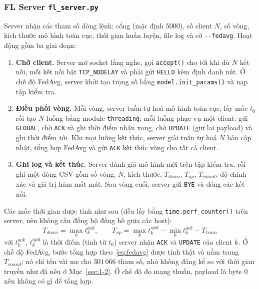 \subsubsection{FL Server \texttt{fl\_server.py}}
Server nhận các tham số dòng lệnh: cổng (mặc định 5000), số client $N$, số vòng, kích thước mô hình toàn cục, thời gian huấn luyện, file log và cờ \texttt{-{}-fedavg}. Hoạt động gồm ba giai đoạn:
\begin{enumerate}
    \item \textbf{Chờ client.} Server mở socket lắng nghe, gọi \texttt{accept()} cho tới khi đủ $N$ kết nối, mỗi kết nối bật \texttt{TCP\_NODELAY} và phải gửi \texttt{HELLO} kèm định danh nút. Ở chế độ FedAvg, server khởi tạo trọng số bằng \texttt{model.init\_params()} và nạp tập kiểm tra.
    \item \textbf{Điều phối vòng.} Mỗi vòng, server tuần tự hoá mô hình toàn cục, lấy mốc $t_0$ rồi tạo $N$ luồng bằng module \texttt{threading}; mỗi luồng phục vụ một client: gửi \texttt{GLOBAL}, chờ \texttt{ACK} và ghi thời điểm nhận xong, chờ \texttt{UPDATE} (giữ lại payload) và ghi thời điểm tới. Khi mọi luồng kết thúc, server giải tuần tự hoá $N$ bản cập nhật, tổng hợp FedAvg và gửi \texttt{ACK} kết thúc vòng cho tất cả client.
    \item \textbf{Ghi log và kết thúc.} Server đánh giá mô hình mới trên tập kiểm tra, rồi ghi một dòng CSV gồm số vòng, $N$, kích thước, $T_{down}$, $T_{up}$, $T_{round}$, độ chính xác và giá trị hàm mất mát. Sau vòng cuối, server gửi \texttt{BYE} và đóng các kết nối.
\end{enumerate}
Các mốc thời gian được tính như sau (đều lấy bằng \texttt{time.perf\_counter()} trên server, nên không cần đồng bộ đồng hồ giữa các host):
\begin{equation}
    T_{down} = \max_k t^{ack}_k, \qquad
    T_{up} = \max_k t^{upd}_k - \min_k t^{ack}_k - T_{train}
    \label{eq:measure}
\end{equation}
với $t^{ack}_k$, $t^{upd}_k$ là thời điểm (tính từ $t_0$) server nhận \texttt{ACK} và \texttt{UPDATE} của client $k$. Ở chế độ FedAvg, bước tổng hợp theo~\eqref{eq:fedavg} được tính thật và nằm trong $T_{round}$; nó chỉ tốn vài ms cho 301\,066 tham số, nhỏ không đáng kể so với thời gian truyền như đã nêu ở Mục~\ref{sec:1-2}. Ở chế độ đo mạng thuần, payload là byte 0 nên không có gì để tổng hợp.

